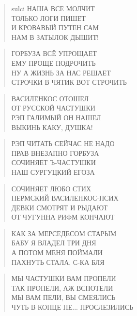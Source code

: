 \poemtitle{***}
\begin{verse}
sulci НАША ВСЕ МОЛЧИТ\\
ТОЛЬКО ЛОГИ ПИШЕТ\\
И КРОВАВЫЙ ПУТЕН САМ\\
НАМ В ЗАТЫЛОК ДЫШИТ!
\end{verse}

\poemtitle{***}
\begin{verse}
ГОРБУЗА ВСЁ УПРОЩАЕТ\\
ЕМУ ПРОЩЕ ПОДРОЧИТЬ\\
НУ А ЖИЗНЬ ЗА НАС РЕШАЕТ\\
СТРОЧКИ В ЧЯТИК ВОТ СТРОЧИТЬ
\end{verse}

\poemtitle{***}
\begin{verse}
ВАСИЛЕНКОС ОТОШЕЛ\\
ОТ РУССКОЙ ЧАСТУШКИ\\
РЭП ГАЛИМЫЙ ОН НАШЕЛ\\
ВЫКИНЬ КАКУ, ДУШКА!
\end{verse}

\poemtitle{***}
\begin{verse}
РЭП ЧИТАТЬ СЕЙЧАС НЕ НАДО\\
ПРАВ ВНЕЗАПНО ГОРБУЗА\\
СОЧИНЯЕТ Ъ-ЧАСТУШКИ\\
НАШ СУРГУЦКИЙ ЕГОЗА
\end{verse}

\poemtitle{***}
\begin{verse}
СОЧИНЯЕТ ЛЮБО СТИХ\\
ПЕРМСКИЙ ВАСИЛЕНКОС-ПСИХ\\
ДЕВКИ СМОТРЯТ И РЫДАЮТ\\
ОТ ЧУГУННА РИФМ КОНЧАЮТ
\end{verse}

\poemtitle{***}
\begin{verse}
КАК ЗА МЕРСЕДЕСОМ СТАРЫМ\\
БАБУ Я ВЛАДЕЛ ТРИ ДНЯ\\
А ПОТОМ МЕНЯ ПОЙМАЛИ\\
ПАХНУТЬ СТАЛА, С-КА БЛЯ
\end{verse}

\poemtitle{***}
\begin{verse}
МЫ ЧАСТУШКИ ВАМ ПРОПЕЛИ\\
ТАК ПРОПЕЛИ, АЖ ВСПОТЕЛИ\\
МЫ ВАМ ПЕЛИ, ВЫ СМЕЯЛИСЬ\\
ЧУТЬ В КОНЦЕ НЕ... ПРОСЛЕЗИЛИСЬ
\end{verse}

